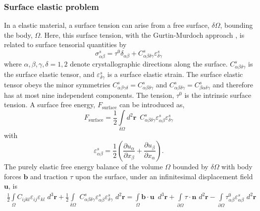 \documentclass[16pt]{article} %
\begin{document}
\subsubsection{Surface elastic problem}
%
In a elastic material, a surface tension can arise from a free surface, $\delta \Omega$, bounding the body, $\Omega$.
%
Here, this surface tension, with the Gurtin-Murdoch approach \cite{Morton1975},  is related to surface tensorial quantities by
%
\begin{equation}\tag{3.1}
\sigma_{\alpha \beta}^s = \tau^0 \delta_{\alpha \beta} + C_{\alpha \beta \delta \gamma}^s \varepsilon_{\delta \gamma}^s
\end{equation}
%
where $\alpha, \beta, \gamma, \delta = 1,2$ denote crystallographic directions along the surface.
%
$C_{\alpha \beta \delta \gamma}^s$ is the surface elastic tensor, and $\varepsilon_{\delta \gamma}^s$ is a surface elastic strain. The surface elastic tensor obeys the minor symmetries $C_{\alpha \beta \gamma \delta}^s = C_{\alpha \beta \delta \gamma }^s$ and $C_{\alpha \beta \delta \gamma}^s = C_{\beta \alpha \delta \gamma }^s$ and therefore has at most nine independent components.
%
The tension, $\tau^0$ is the intrinsic surface tension.
%
A surface free energy, $F_\mathrm{surface}$ can be introduced as,
%
\begin{equation}\tag{3.5}
F_\mathrm{surface} = \frac{1}{2} \int\limits_{\delta \Omega} d^2 \textbf{r} \,\,\, C_{\alpha \beta \delta \gamma }^s \varepsilon_{\alpha \beta}^s \varepsilon_{\delta \gamma}^s 
\end{equation}
%
with
%
\begin{equation}\tag{3.6}
 \varepsilon_{\alpha \beta}^s = \frac{1}{2} \left(\frac{\partial u_\alpha}{\partial x_\beta} + \frac{\partial u_\beta}{\partial x_\alpha} \right).
\end{equation}
%
The purely elastic free energy balance of the volume $\Omega$ bounded by $\delta \Omega$ with body forces $\textbf{b}$ and traction $\tau$ upon the surface, under an infinitesimal displacement field $\textbf{u}$, is
%
\begin{align}\tag{3.7}
 \frac{1}{2} \int\limits_\Omega C_{ijkl} \varepsilon_{ij} \varepsilon_{kl} \,\,d^3 \textbf{r} + \frac{1}{2} \int\limits_{\delta \Omega} \,\, C_{\alpha \beta \delta \gamma}^s \varepsilon_{\alpha \beta}^s \varepsilon_{\delta \gamma}^s\,\, d^2 \textbf{r} = \int\limits_\Omega \textbf{b} \cdot \textbf{u} \,\,\,d^3 \textbf{r} + \int\limits_{\partial \Omega} \tau \cdot \mathbf{\hat{n}} \,\,d^2 \textbf{r} - \int\limits_{\partial \Omega} \tau^0_{\alpha \beta} \varepsilon_{\alpha \beta}^s \,\,d^2 \textbf{r} \\ \nonumber
\end{align}
\end{document}
